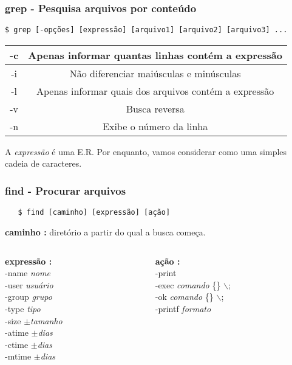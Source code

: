 \documentclass{beamer}
\begin{document}
\begin{frame}[fragile]
   \frametitle{grep - Pesquisa arquivos por conteúdo}
   \scriptsize
   \begin{verbatim}
$ grep [-opções] [expressão] [arquivo1] [arquivo2] [arquivo3] ...
   \end{verbatim}
   \normalsize
   \begin{table}
      \begin{tabular}{ c | c }
         \hline
         -c & Apenas informar quantas linhas contém a expressão \\
         \hline 
         -i & Não diferenciar maiúsculas e minúsculas \\
         \hline
         -l & Apenas informar quais dos arquivos contém a expressão \\
         \hline
         -v & Busca reversa \\
         \hline
         -n & Exibe o número da linha \\
         \hline
      \end{tabular}
   \end{table}
   A \textit{expressão} é uma E.R. Por enquanto, vamos considerar como uma simples cadeia de caracteres.
\end{frame}

\begin{frame}[fragile]
   \frametitle{find - Procurar arquivos}
   \begin{verbatim}
   $ find [caminho] [expressão] [ação]
   \end{verbatim}
   \textbf{caminho :} diretório a partir do qual a busca começa. \\
   \begin{columns}
   \begin{column}{0.5\textwidth}
   \textbf{expressão :} \\ 
      -name \textit{nome} \\
      -user \textit{usuário} \\
      -group \textit{grupo} \\
      -type \textit{tipo} \\
      -size $\pm$\textit{tamanho} \\
      -atime $\pm$\textit{dias} \\
      -ctime $\pm$\textit{dias} \\
      -mtime $\pm$\textit{dias} \\
   \end{column}
   \begin{column}{0.5\textwidth}
   \textbf{ação :} \\
      -print \\
      -exec \textit{comando} \{\} $\backslash$; \\
      -ok \textit{comando} \{\} $\backslash$; \\ 
      -printf \textit{formato}
   \end{column}
   \end{columns}
\end{frame}
\end{document}
